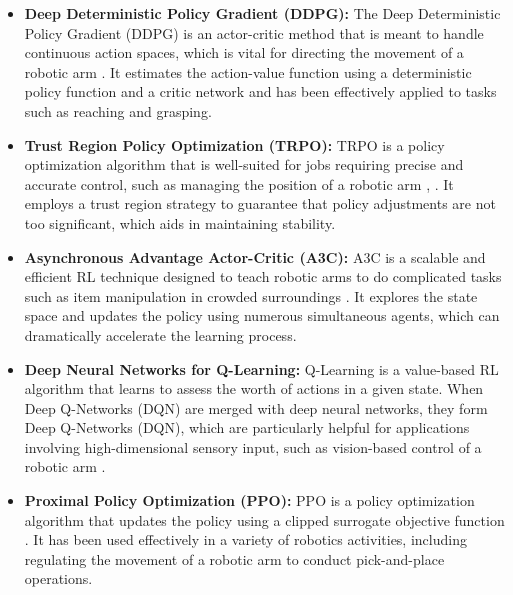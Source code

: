 \documentclass[12pt,oneside]{article}
\begin{document}
\begin{itemize}
\item \textbf{Deep Deterministic Policy Gradient (DDPG):} The Deep Deterministic Policy Gradient (DDPG) is an actor-critic method that is meant to handle continuous action spaces, which is vital for directing the movement of a robotic arm \cite{44_villegas2018neural}. It estimates the action-value function using a deterministic policy function and a critic network and has been effectively applied to tasks such as reaching and grasping.
\item \textbf{Trust Region Policy Optimization (TRPO):} TRPO is a policy optimization algorithm that is well-suited for jobs requiring precise and accurate control, such as managing the position of a robotic arm \cite{45_1_lim2020federated}, \cite{45_kim2020motion}. It employs a trust region strategy to guarantee that policy adjustments are not too significant, which aids in maintaining stability.
\item \textbf{Asynchronous Advantage Actor-Critic (A3C): }A3C is a scalable and efficient RL technique designed to teach robotic arms to do complicated tasks such as item manipulation in crowded surroundings \cite{46_han2023survey}. It explores the state space and updates the policy using numerous simultaneous agents, which can dramatically accelerate the learning process.
\item \textbf{Deep Neural Networks for Q-Learning:} Q-Learning is a value-based RL algorithm that learns to assess the worth of actions in a given state. When Deep Q-Networks (DQN) are merged with deep neural networks, they form Deep Q-Networks (DQN), which are particularly helpful for applications involving high-dimensional sensory input, such as vision-based control of a robotic arm \cite{47_gupta2021deep}.
\item \textbf{Proximal Policy Optimization (PPO):} PPO is a policy optimization algorithm that updates the policy using a clipped surrogate objective function \cite{48_schulman2017proximal}. It has been used effectively in a variety of robotics activities, including regulating the movement of a robotic arm to conduct pick-and-place operations.

\end{itemize}
\end{document}
